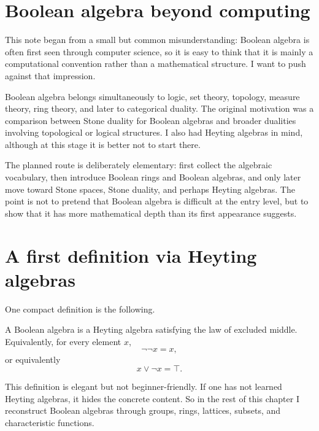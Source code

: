 
\section{Boolean algebra beyond computing}

This note began from a small but common misunderstanding: Boolean algebra is often first seen through computer science, so it is easy to think that it is mainly a computational convention rather than a mathematical structure.  I want to push against that impression.

Boolean algebra belongs simultaneously to logic, set theory, topology, measure theory, ring theory, and later to categorical duality.  The original motivation was a comparison between Stone duality for Boolean algebras and broader dualities involving topological or logical structures.  I also had Heyting algebras in mind, although at this stage it is better not to start there.

\begin{remark}
The planned route is deliberately elementary: first collect the algebraic vocabulary, then introduce Boolean rings and Boolean algebras, and only later move toward Stone spaces, Stone duality, and perhaps Heyting algebras.  The point is not to pretend that Boolean algebra is difficult at the entry level, but to show that it has more mathematical depth than its first appearance suggests.
\end{remark}

\section{A first definition via Heyting algebras}

One compact definition is the following.

\begin{definition}
A Boolean algebra is a Heyting algebra satisfying the law of excluded middle.  Equivalently, for every element \(x\),
\[
  \neg\neg x=x,
\]
or equivalently
\[
  x\vee\neg x=\top.
\]
\end{definition}

\begin{caution}
This definition is elegant but not beginner-friendly.  If one has not learned Heyting algebras, it hides the concrete content.  So in the rest of this chapter I reconstruct Boolean algebras through groups, rings, lattices, subsets, and characteristic functions.
\end{caution}

